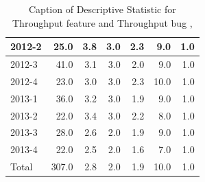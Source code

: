 \documentclass[UKenglish]{ifimaster}  %
\begin{document}
\begin{table}[!htbp]
\begin{adjustwidth}{-2.5cm}{}
{{\begin{tabular}{ | l | r | r | r | r | r | r | }
2012-2 & 25.0 & 3.8 & 3.0 & 2.3 & 9.0 & 1.0\\ \hline
2012-3 & 41.0 & 3.1 & 3.0 & 2.0 & 9.0 & 1.0\\ \hline
2012-4 & 23.0 & 3.0 & 3.0 & 2.3 & 10.0 & 1.0\\ \hline
2013-1 & 36.0 & 3.2 & 3.0 & 1.9 & 9.0 & 1.0\\ \hline
2013-2 & 22.0 & 3.4 & 3.0 & 2.2 & 8.0 & 1.0\\ \hline
2013-3 & 28.0 & 2.6 & 2.0 & 1.9 & 9.0 & 1.0\\ \hline
2013-4 & 22.0 & 2.5 & 2.0 & 1.6 & 7.0 & 1.0\\ \hline
Total & 307.0 & 2.8 & 2.0 & 1.9 & 10.0 & 1.0\\ \hline
\end{tabular}
}
}
\end{adjustwidth}
\caption[Optional caption for list of figures]{Caption of Descriptive Statistic for Throughput feature and Throughput bug  , }
\label{DS:9:2}
\end{table}
\end{document}
